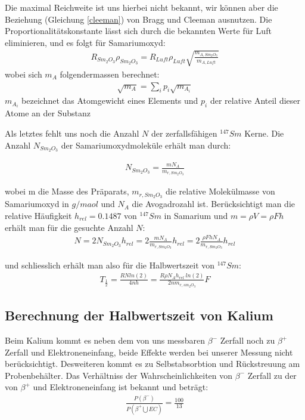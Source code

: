 \documentclass[12pt]{article}
\begin{document}
Die maximal Reichweite ist uns hierbei nicht bekannt, wir können aber die Beziehung (Gleichung \ref{cleeman}) von Bragg und Cleeman ausnutzen. Die Proportionalitätskonstante lässt sich durch die bekannten Werte für Luft eliminieren, und es folgt für Samariumoxyd:
\begin{align}
 R_{Sm_2O_3} \rho_{Sm_2O_3} = R_{Luft} \rho_{Luft} \sqrt{\frac{m_{A,Sm_2O_3}}{m_{A,Luft}}}
\end{align}
wobei sich $m_A$ folgendermassen berechnet:
\begin{align}
 \sqrt{m_A}=\sum \limits_i p_i \sqrt{m_{A_i}}
\end{align}
$m_{A_i}$ bezeichnet das Atomgewicht eines Elements und $p_i$ der relative Anteil dieser Atome an der Substanz

Als letztes fehlt uns noch die Anzahl $N$ der zerfallsfähigen $^{147}Sm$ Kerne. Die Anzahl $N_{Sm_2O_3}$ der Samariumoxydmoleküle erhält man durch:

\begin{align}
 N_{Sm_2O_3} = \frac{m N_A}{m_{r,Sm_2O_3}}
\end{align}

wobei m die Masse des Präparats, $m_{r,Sm_2O_3}$ die relative Molekülmasse von Samariumoxyd in $g/maol$ und $N_A$ die Avogadrozahl ist.
Berücksichtigt man die relative Häufigkeit $h_{rel} = 0.1487$ von $^{147}Sm$ in Samarium und $m = \rho V = \rho F h$ erhält man für die gesuchte Anzahl $N$:
\begin{align}
 N=2N_{Sm_2O_3} h_{rel}= 2 \frac{m N_A}{m_{r,Sm_2O_3}} h_{rel}=2 \frac{\rho F h N_A}{m_{r,Sm_2O_3}}h_{rel}
\end{align}

und schliesslich erhält man also für die Halbwertszeit von $^{147}Sm$:
\begin{align}
 T_{\frac{1}{2}} = \frac{R N ln(2)}{4 n h} = \frac{R \rho  N_A h_{rel} ~ ln (2)}{2n m_{r,sm_2O_3}} F
\end{align}

\subsection{Berechnung der Halbwertszeit von Kalium}

Beim Kalium kommt es neben dem von uns messbaren $\beta^-$ Zerfall noch
 zu $\beta^+$ Zerfall und Elektroneneinfang, beide Effekte werden bei unserer
 Messung nicht berücksichtigt. Desweiteren kommt es zu Selbstabsorbtion und Rückstreuung 
am Probenbehälter. Das Verhältniss der Wahrscheinlichkeiten von $\beta^-$ Zerfall zu der
 von $\beta^+$ und Elektroneneinfang ist bekannt und beträgt:
\begin{align}
 \frac{P(\beta^-)}{P(\beta^+ \bigcup EC)} = \frac{100}{13}
\end{align}
\end{document}
